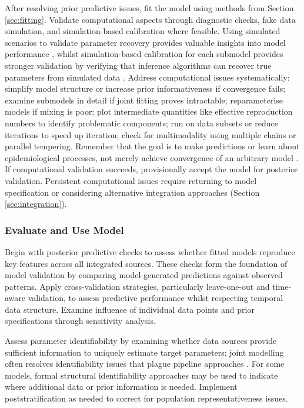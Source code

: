 \documentclass{article}
\begin{document}
After resolving prior predictive issues, fit the model using methods from Section \ref{sec:fitting}.
Validate computational aspects through diagnostic checks, fake data simulation, and simulation-based calibration where feasible.
Using simulated scenarios to validate parameter recovery provides valuable insights into model performance \citep{bouman2024bayesian}, whilst simulation-based calibration for each submodel provides stronger validation by verifying that inference algorithms can recover true parameters from simulated data \citep{talts2018validating}.
Address computational issues systematically: simplify model structure or increase prior informativeness if convergence fails; examine submodels in detail if joint fitting proves intractable; reparameterise models if mixing is poor; plot intermediate quantities like effective reproduction numbers to identify problematic components; run on data subsets or reduce iterations to speed up iteration; check for multimodality using multiple chains or parallel tempering.
Remember that the goal is to make predictions or learn about epidemiological processes, not merely achieve convergence of an arbitrary model \citep{gelman2020bayesian}.
If computational validation succeeds, provisionally accept the model for posterior validation.
Persistent computational issues require returning to model specification or considering alternative integration approaches (Section \ref{sec:integration}).

\subsubsection{Evaluate and Use Model}

Begin with posterior predictive checks to assess whether fitted models reproduce key features across all integrated sources.
These checks form the foundation of model validation by comparing model-generated predictions against observed patterns.
Apply cross-validation strategies, particularly leave-one-out and time-aware validation, to assess predictive performance whilst respecting temporal data structure.
Examine influence of individual data points and prior specifications through sensitivity analysis.

Assess parameter identifiability by examining whether data sources provide sufficient information to uniquely estimate target parameters; joint modelling often resolves identifiability issues that plague pipeline approaches \citep{lison2024generative, russell2024combined}.
For some models, formal structural identifiability approaches may be used to indicate where additional data or prior information is needed.
Implement poststratification as needed to correct for population representativeness issues.
\end{document}
